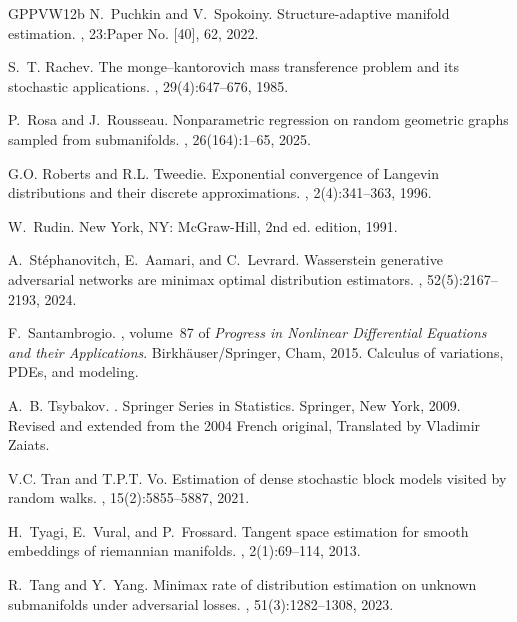 \documentclass[10pt,a4paper]{article}
\begin{document}
{\begin{thebibliography}{GPPVW12b}
N.~Puchkin and V.~Spokoiny.
\newblock Structure-adaptive manifold estimation.
, 23:Paper No. [40], 62, 2022.

S.~T. Rachev.
\newblock The monge–kantorovich mass transference problem and its stochastic
  applications.
, 29(4):647--676, 1985.

P.~Rosa and J.~Rousseau.
\newblock Nonparametric regression on random geometric graphs sampled from
  submanifolds.
, 26(164):1--65, 2025.

G.O. Roberts and R.L. Tweedie.
\newblock Exponential convergence of {L}angevin distributions and their
  discrete approximations.
, 2(4):341--363, 1996.

W.~{Rudin}.
\newblock New York, NY: McGraw-Hill, 2nd ed. edition, 1991.

A.~St\'ephanovitch, E.~Aamari, and C.~Levrard.
\newblock Wasserstein generative adversarial networks are minimax optimal
  distribution estimators.
, 52(5):2167--2193, 2024.

F.~Santambrogio.
, volume~87 of {\em
  Progress in Nonlinear Differential Equations and their Applications}.
\newblock Birkh\"auser/Springer, Cham, 2015.
\newblock Calculus of variations, PDEs, and modeling.

A.~B. {Tsybakov}.
.
\newblock Springer Series in Statistics. Springer, New York, 2009.
\newblock Revised and extended from the 2004 French original, Translated by
  Vladimir Zaiats.

V.C. Tran and T.P.T. Vo.
\newblock Estimation of dense stochastic block models visited by random walks.
, 15(2):5855--5887, 2021.

H.~Tyagi, E.~Vural, and P.~Frossard.
\newblock Tangent space estimation for smooth embeddings of riemannian
  manifolds{\textregistered}.
, 2(1):69--114, 2013.

R.~Tang and Y.~Yang.
\newblock Minimax rate of distribution estimation on unknown submanifolds under
  adversarial losses.
, 51(3):1282--1308, 2023.


\end{thebibliography}}
\end{document}
